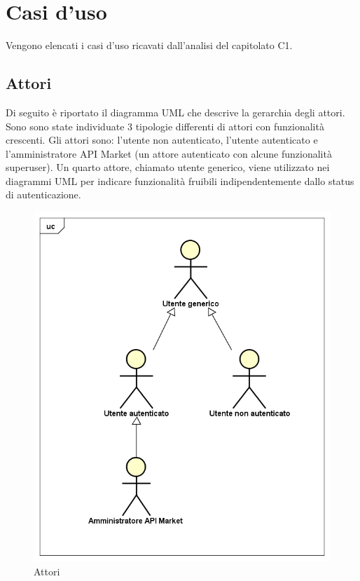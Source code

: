 \newpage
\section{Casi d'uso}
Vengono elencati i casi d'uso ricavati dall'analisi del capitolato C1.

\subsection{Attori}
Di seguito è riportato il diagramma UML che descrive la gerarchia degli attori. Sono sono state individuate 3 tipologie differenti di attori con funzionalità crescenti. Gli attori sono: l'utente non autenticato, l'utente autenticato e l'amministratore API Market (un attore autenticato con alcune funzionalità superuser). Un quarto attore, chiamato utente generico, viene utilizzato nei diagrammi UML per indicare funzionalità fruibili indipendentemente dallo status di autenticazione.

\label{Attori}

\begin{figure}[ht]
	\centering
	\includegraphics[scale=0.45]{UML/attori.png}
	\caption{Attori}
\end{figure}


